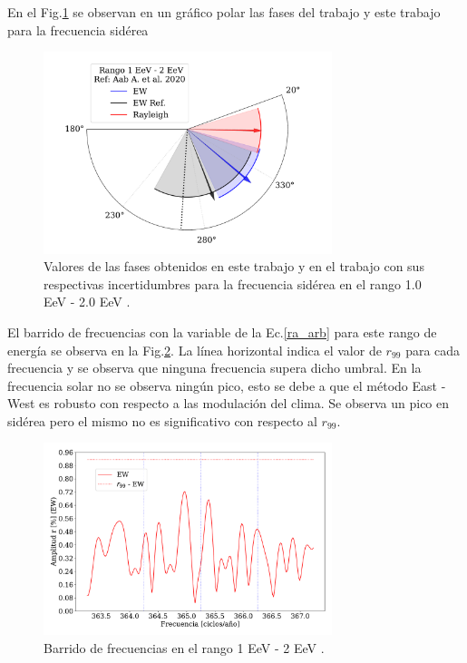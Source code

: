     En el Fig.\ref{fig:tercer} se observan en un gráfico polar las fases del trabajo \cite{Aab_2020} y este trabajo para la frecuencia sidérea
    \begin{figure}[H]
        \begin{small}
            \begin{center}
                \includegraphics[width=0.75\textwidth]{phase_tercer_bin_v2.pdf}
            \end{center}
        \caption{Valores de las fases obtenidos en este trabajo y en el trabajo \cite{Aab_2020} con sus respectivas incertidumbres para la frecuencia sidérea en el  rango 1.0 EeV - 2.0 EeV .}
        \label{fig:tercer}
        \end{small}
    \end{figure}


    El barrido de frecuencias con la variable de la Ec.\ref{ra_arb} para este rango de energía se observa en la Fig.\ref{fig:tercer_barrido}. La línea horizontal indica el valor de $r_{99}$ para cada frecuencia y se observa que ninguna frecuencia supera dicho umbral. En la frecuencia solar no se observa ningún pico, esto se debe a que el método East - West es robusto con respecto a las modulación del clima. Se observa un pico en sidérea pero el mismo no es significativo con respecto al $r_{99}$.


    \begin{figure}[H]
        \begin{small}
            \begin{center}
                \includegraphics[width=0.75\textwidth]{plot_bin_3_barrido_v3_EW.pdf}
            \end{center}
            \caption{Barrido de frecuencias en el rango 1 EeV - 2 EeV .}
            \label{fig:tercer_barrido}
        \end{small}
    \end{figure}    

